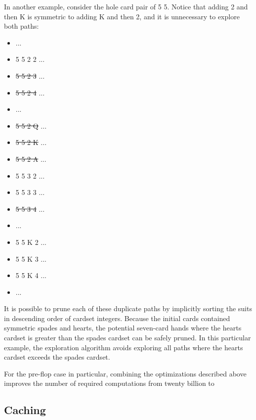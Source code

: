 In another example, consider the hole card pair of 5\xs{} 5\xh{}.
Notice that adding 2\xs{} and then K\xh{} is symmetric to adding K\xs{} and then 2\xh{}, and it is unnecessary to explore both paths:
\begin{itemize}
\singlespacing
\item ...
\item 5\xs{} 5\xh{} 2\xs{} 2\xh{} ...
\item \sout{5\xs{} 5\xh{} 2\xs{} 3\xh{}} ...
\item \sout{5\xs{} 5\xh{} 2\xs{} 4\xh{}} ...
\item ...
\item \sout{5\xs{} 5\xh{} 2\xs{} Q\xh{}} ...
\item \sout{5\xs{} 5\xh{} 2\xs{} K\xh{}} ...
\item \sout{5\xs{} 5\xh{} 2\xs{} A\xh{}} ...
\item 5\xs{} 5\xh{} 3\xs{} 2\xh{} ...
\item 5\xs{} 5\xh{} 3\xs{} 3\xh{} ...
\item \sout{5\xs{} 5\xh{} 3\xs{} 4\xh{}} ...
\item ...
\item 5\xs{} 5\xh{} K\xs{} 2\xh{} ...
\item 5\xs{} 5\xh{} K\xs{} 3\xh{} ...
\item 5\xs{} 5\xh{} K\xs{} 4\xh{} ...
\item ...
\end{itemize}
It is possible to prune each of these duplicate paths by implicitly sorting the suits in descending order of cardset integers.
Because the initial cards contained symmetric spades and hearts, the potential seven-card hands where the hearts cardset is greater than the spades cardset can be safely pruned.
In this particular example, the exploration algorithm avoids exploring all paths where the hearts cardset exceeds the spades cardset.


For the pre-flop case in particular, combining the optimizations described above improves the number of required computations from twenty billion to %

\subsection{Caching}
\label{sec:Caching}


